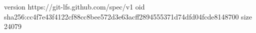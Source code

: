 version https://git-lfs.github.com/spec/v1
oid sha256:cc4f7e43f4122cf88cc8bee572d3e63acff2894555371d74dfd04fcde8148700
size 24079
